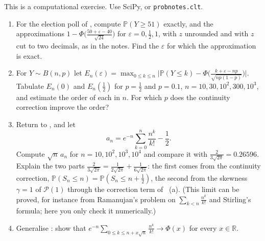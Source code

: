 \begin{exercise}\label{ex:ct-continuity}
\medium This is a computational exercise. Use SciPy, or \texttt{probnotes.clt}.
\begin{enumerate}[label=(\alph*)]
  \item For the election poll of , compute $\mathbb P(Y\ge51)$ exactly, and the
    approximations $1-\Phi\big(\frac{50+\varepsilon-40}{\sqrt{24}}\big)$ for $\varepsilon=0,\frac12,1$,
    with $z$ unrounded and with $z$ cut to two decimals, as in the notes. Find the $\varepsilon$ for
    which the approximation is exact.
  \item For $Y\sim B(n,p)$ let
    $E_n(\varepsilon)=\max_{0\le k\le n}\big|\mathbb P(Y\le k)-\Phi\big(\frac{k+\varepsilon-np}{\sqrt{np(1-p)}}\big)\big|$.
    Tabulate $E_n(0)$ and $E_n(\frac12)$ for $p=\frac12$ and $p=0.1$, $n=10,30,10^2,300,10^3$, and
    estimate the order of each in $n$. For which $p$ does the continuity correction improve the
    order?
  \item Return to , and let
    \[
      a_n=e^{-n}\sum_{k=0}^n\frac{n^k}{k!}-\frac12 .
    \]
    Compute $\sqrt n\,a_n$ for $n=10,10^2,10^3,10^4$ and compare it with
    $\frac2{3\sqrt{2\pi}}=0.26596$. Explain the two parts
    $\frac2{3\sqrt{2\pi}}=\frac1{2\sqrt{2\pi}}+\frac1{6\sqrt{2\pi}}$: the first comes from the continuity
    correction, $\mathbb P(S_n\le n)=\mathbb P(S_n\le n+\frac12)$, the second from the skewness
    $\gamma=1$ of $\mathcal P(1)$ through the correction term of ~(a). (This
    limit can be proved, for instance from Ramanujan's problem on $\sum_{k<n}\frac{n^k}{k!}$ and
    Stirling's formula; here you only check it numerically.)
  \item Generalise : show that
    $e^{-n}\sum_{0\le k\le n+x\sqrt n}\frac{n^k}{k!}\to\Phi(x)$ for every $x\in\mathbb R$.
\end{enumerate}
\end{exercise}

